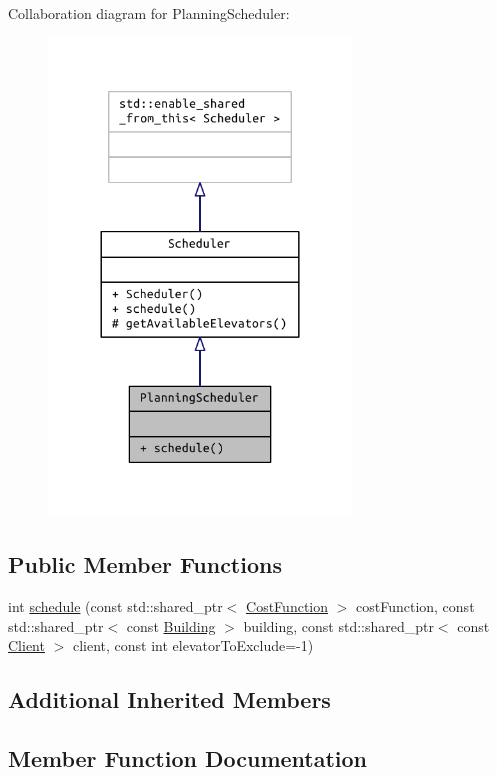 Collaboration diagram for Planning\+Scheduler\+:
\nopagebreak
\begin{figure}[H]
\begin{center}
\leavevmode
\includegraphics[width=228pt]{class_planning_scheduler__coll__graph}
\end{center}
\end{figure}
\subsection*{Public Member Functions}
\begin{DoxyCompactItemize}
\item 
int \hyperlink{class_planning_scheduler_a30e0bb81405e162e596e428cb2a6c1e3}{schedule} (const std\+::shared\+\_\+ptr$<$ \hyperlink{class_cost_function}{Cost\+Function} $>$ cost\+Function, const std\+::shared\+\_\+ptr$<$ const \hyperlink{class_building}{Building} $>$ building, const std\+::shared\+\_\+ptr$<$ const \hyperlink{class_client}{Client} $>$ client, const int elevator\+To\+Exclude=-\/1)
\end{DoxyCompactItemize}
\subsection*{Additional Inherited Members}


\subsection{Member Function Documentation}
\hypertarget{class_planning_scheduler_a30e0bb81405e162e596e428cb2a6c1e3}{}
